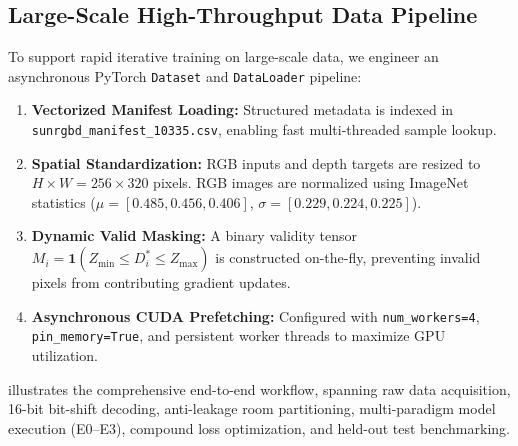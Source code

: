 \documentclass[twoside,final]{hcmut-report}
\begin{document}
\subsection{Large-Scale High-Throughput Data Pipeline}

To support rapid iterative training on large-scale data, we engineer an asynchronous PyTorch \texttt{Dataset} and \texttt{DataLoader} pipeline:

\begin{enumerate}

  \item \textbf{Vectorized Manifest Loading:} Structured metadata is indexed in \texttt{sunrgbd\_\allowbreak{}manifest\_\allowbreak{}10335.csv}, enabling fast multi-threaded sample lookup.

  \item \textbf{Spatial Standardization:} RGB inputs and depth targets are resized to $H \times W = 256 \times 320$ pixels. RGB images are normalized using ImageNet statistics ($\mu = [0.485, 0.456, 0.406]$, $\sigma = [0.229, 0.224, 0.225]$).

  \item \textbf{Dynamic Valid Masking:} A binary validity tensor $M_i = \mathbf{1}(Z_{\min} \le D_i^* \le Z_{\max})$ is constructed on-the-fly, preventing invalid pixels from contributing gradient updates.

  \item \textbf{Asynchronous CUDA Prefetching:} Configured with \texttt{num\_workers=4}, \texttt{pin\_memory=True}, and persistent worker threads to maximize GPU utilization.

\end{enumerate}

 illustrates the comprehensive end-to-end workflow, spanning raw data acquisition, 16-bit bit-shift decoding, anti-leakage room partitioning, multi-paradigm model execution (E0--E3), compound loss optimization, and held-out test benchmarking.
\end{document}

